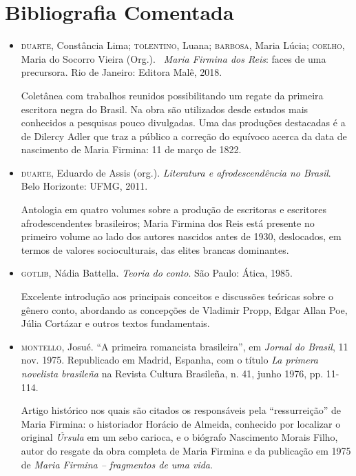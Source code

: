\documentclass[12pt]{extarticle}
\begin{document}
\section{Bibliografia Comentada}

\begin{itemize}
\item\textsc{duarte}, Constância Lima; \textsc{tolentino}, Luana; \textsc{barbosa}, 
Maria Lúcia; \textsc{coelho}, Maria do Socorro Vieira (Org.).
\emph{~Maria Firmina dos Reis}: faces de
uma precursora. Rio de Janeiro: Editora Malê, 2018. 

Coletânea com
trabalhos reunidos possibilitando um regate da primeira escritora negra
do Brasil. Na obra são utilizados desde estudos mais conhecidos a
pesquisas pouco divulgadas. Uma das produções destacadas é a de Dilercy
Adler que traz a público a correção do equívoco acerca da data de
nascimento de Maria Firmina: 11 de março de 1822.

\item\textsc{duarte}, Eduardo de Assis (org.). 
\emph{Literatura e afrodescendência no Brasil}. Belo Horizonte: UFMG, 2011. 

Antologia em quatro volumes sobre a
produção de escritoras e escritores afrodescendentes brasileiros; Maria
Firmina dos Reis está presente no primeiro volume ao lado dos autores
nascidos antes de 1930, deslocados, em termos de valores socioculturais,
das elites brancas dominantes.

\item\textsc{gotlib}, Nádia Battella. \emph{Teoria do conto}. São Paulo: Ática, 1985.

Excelente introdução aos principais conceitos e discussões teóricas
sobre o gênero conto, abordando as concepções de Vladimir Propp, Edgar
Allan Poe, Júlia Cortázar e outros textos fundamentais.

\item\textsc{montello}, Josué. ``A primeira romancista brasileira'', em \emph{Jornal do
Brasil}, 11 nov. 1975. Republicado em Madrid, Espanha, com o título
\emph{La primera novelista brasileña} na Revista Cultura Brasileña,
n. 41, junho 1976, pp. 11-114. 

Artigo histórico nos quais são citados os
responsáveis pela ``ressurreição'' de Maria Firmina: o historiador
Horácio de Almeida, conhecido por localizar o original \emph{Úrsula} em
um sebo carioca, e o biógrafo Nascimento Morais Filho, autor do resgate
da obra completa de Maria Firmina e da publicação em 1975 de \emph{Maria
Firmina -- fragmentos de uma vida}.


\end{itemize}
\end{document}

